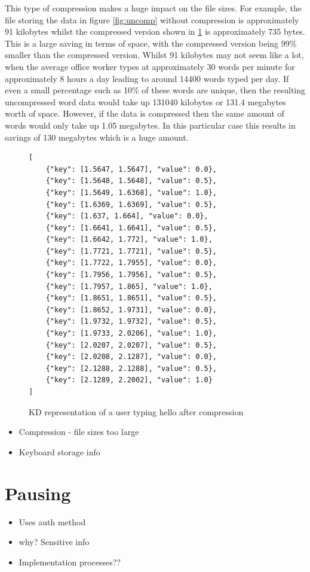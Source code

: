 \documentclass[10pt,a4paper]{report}
\begin{document}
This type of compression makes a huge impact on the file sizes. For example, the file storing the data in figure \ref{fig:uncomp} without compression is approximately 91 kilobytes whilst the compressed version shown in \ref{fig:compression} is approximately 735 bytes. This is a large saving in terms of space, with the compressed version being 99\% smaller than the compressed version. Whilst 91 kilobytes may not seem like a lot, when the average office worker types at approximately 30 words per minute\cite{naskar_2020} for approximately 8 hours a day leading to around 14400 words typed per day. If even a small percentage such as 10\% of these words are unique, then the resulting uncompressed word data would take up 131040 kilobytes or 131.4 megabytes worth of space. However, if the data is compressed then the same amount of words would only take up 1.05 megabytes. In this particular case this results in savings of 130 megabytes which is a huge amount.

\begin{figure}[h!]
	\begin{lstlisting}
[
    {"key": [1.5647, 1.5647], "value": 0.0}, 
    {"key": [1.5648, 1.5648], "value": 0.5}, 
    {"key": [1.5649, 1.6368], "value": 1.0}, 
    {"key": [1.6369, 1.6369], "value": 0.5},
    {"key": [1.637, 1.664], "value": 0.0}, 
    {"key": [1.6641, 1.6641], "value": 0.5}, 
    {"key": [1.6642, 1.772], "value": 1.0}, 
    {"key": [1.7721, 1.7721], "value": 0.5}, 
    {"key": [1.7722, 1.7955], "value": 0.0}, 
    {"key": [1.7956, 1.7956], "value": 0.5}, 
    {"key": [1.7957, 1.865], "value": 1.0},
    {"key": [1.8651, 1.8651], "value": 0.5}, 
    {"key": [1.8652, 1.9731], "value": 0.0}, 
    {"key": [1.9732, 1.9732], "value": 0.5}, 
    {"key": [1.9733, 2.0206], "value": 1.0}, 
    {"key": [2.0207, 2.0207], "value": 0.5}, 
    {"key": [2.0208, 2.1287], "value": 0.0}, 
    {"key": [2.1288, 2.1288], "value": 0.5}, 
    {"key": [2.1289, 2.2002], "value": 1.0}
]
	\end{lstlisting}
	\caption{KD representation of a user typing hello after compression}
	\label{fig:compression}
\end{figure}



\begin{itemize}
	\item Compression - file sizes too large
	\item Keyboard storage info
\end{itemize}
\section{Pausing}
\begin{itemize}
	\item Uses auth method
	\item why? Sensitive info
	\item Implementation processes??
\end{itemize}
\end{document}
